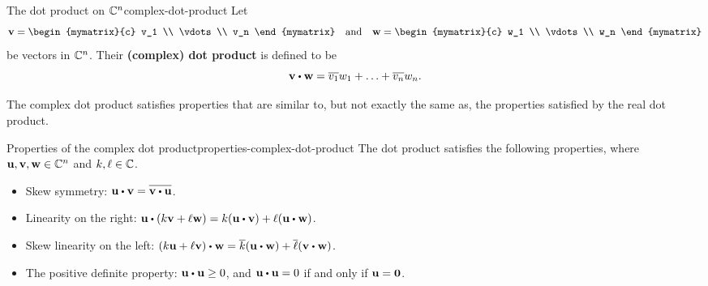 \begin{definition}{The dot product on $\mathbb{C}^n$}{complex-dot-product}
  Let
  \begin{equation*}
    \vect{v}=\begin{mymatrix}{c} v_1 \\ \vdots \\ v_n \end{mymatrix}
    \quad\mbox{and}\quad
    \vect{w}=\begin{mymatrix}{c} w_1 \\ \vdots \\ w_n \end{mymatrix}
  \end{equation*}
  be vectors in $\mathbb{C}^n$. Their \textbf{(complex) dot product}%
  is defined to be
  \begin{equation*}
    \vect{v}\dotprod \vect{w} = \overline{v_1}w_1 + \ldots + \overline{v_n}w_n.
  \end{equation*}
\end{definition}

The complex dot product satisfies properties that are similar to, but
not exactly the same as, the properties satisfied by the real dot
product.

\begin{proposition}{Properties of the complex dot product}{properties-complex-dot-product}
  The dot product satisfies the following properties, where
  $\vect{u},\vect{v},\vect{w}\in\C^n$ and $k,\ell\in\mathbb{C}$.
  \begin{itemize}
  \item Skew symmetry: $\vect{u}\dotprod\vect{v}=\overline{\vect{v}\dotprod\vect{u}}$.
  \item Linearity on the right: $\vect{u}\dotprod(k\vect{v}+\ell\vect{w})
    =k(\vect{u}\dotprod \vect{v})+\ell(\vect{u}\dotprod\vect{w})$.
  \item Skew linearity on the left: $(k\vect{u}+\ell\vect{v})\dotprod\vect{w}=\overline{k}(\vect{u}\dotprod\vect{w})+\overline{\ell}(\vect{v}\dotprod\vect{w})$.
  \item The positive definite property: $\vect{u}\dotprod\vect{u}\geq 0$, and $\vect{u}\dotprod\vect{u}=0$ if and only if $\vect{u}=\vect{0}$.
  \end{itemize}
\end{proposition}

